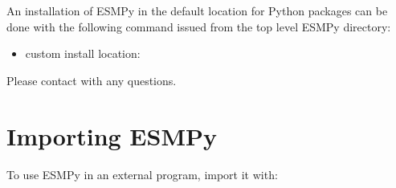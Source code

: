 \documentclass[letterpaper,10pt,english]{sphinxmanual}
\begin{document}
An installation of ESMPy in the default location for Python packages can be done
with the following command issued from the top level ESMPy directory:

\begin{sphinxVerbatim}[commandchars=\\\{\}]
    
\end{sphinxVerbatim}
\begin{itemize}
\item {} 
custom install location:

\end{itemize}

\begin{sphinxVerbatim}[commandchars=\\\{\}]
   

   

  \PYGZbs{}
\end{sphinxVerbatim}

Please contact  with any questions.


\section{Importing ESMPy}
\label{\detokenize{install:importing-esmpy}}
To use ESMPy in an external program, import it with:

\begin{sphinxVerbatim}[commandchars=\\\{\}]
 
\end{sphinxVerbatim}
\end{document}
